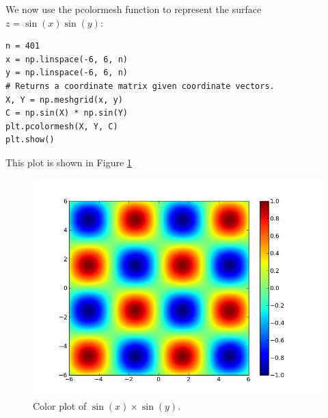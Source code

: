 We now use the pcolormesh function to represent the surface $z=\sin(x)\sin(y)$:
\begin{lstlisting}
n = 401
x = np.linspace(-6, 6, n)
y = np.linspace(-6, 6, n)
# Returns a coordinate matrix given coordinate vectors.
X, Y = np.meshgrid(x, y)
C = np.sin(X) * np.sin(Y)
plt.pcolormesh(X, Y, C)
plt.show()
\end{lstlisting}
This plot is shown in Figure \ref{fig:pcmexample}
\begin{figure}
\includegraphics[width=\textwidth]{sinxsiny.png}
\caption{Color plot of $\sin\left(x\right)\times\sin\left(y\right)$.}
\label{fig:pcmexample}
\end{figure}

